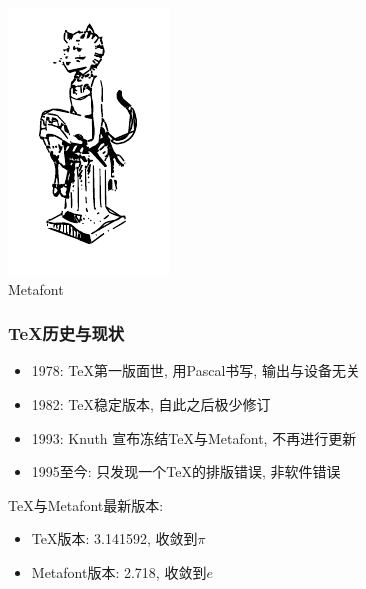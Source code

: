 \documentclass[compress]{beamer}
\begin{document}
\begin{frame}
\begin{minipage}{0.4\hsize}
\includegraphics[width=0.9\hsize]{meta.pdf}\\
\centering Metafont
\end{minipage}

\end{frame}

\begin{frame}
\frametitle{\TeX{}历史与现状}

\begin{itemize}
\item 1978: \TeX{}第一版面世, 用Pascal书写, 输出与设备无关
\item 1982: \TeX{}稳定版本, 自此之后极少修订
\item 1993: Knuth 宣布冻结\TeX{}与Metafont, 不再进行更新
\item 1995至今: 只发现一个\TeX{}的排版错误, 非软件错误

\end{itemize}
\TeX{}与Metafont最新版本:
\begin{itemize}
\item \TeX{}版本: 3.141592, 收敛到\emph{$\pi$}
\item Metafont版本: 2.718, 收敛到\emph{$e$}
\end{itemize}
\end{frame}
\end{document}
